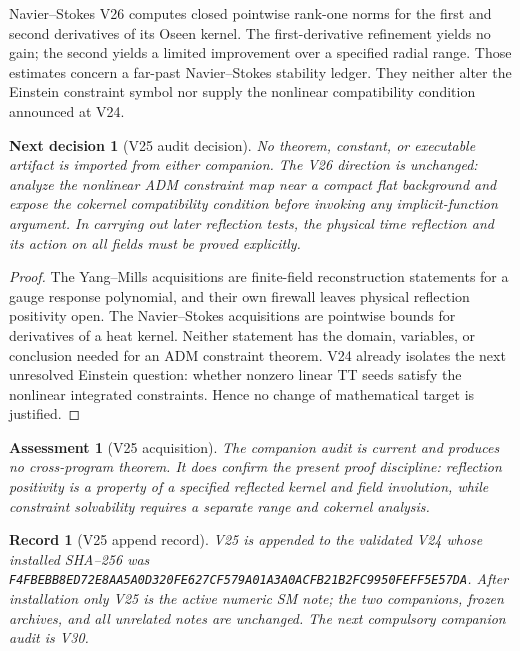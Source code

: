 \documentclass[11pt]{article}
\newtheorem{decision}[theorem]{Next decision}
\newtheorem{assessment}[theorem]{Assessment}
\newtheorem{record}[theorem]{Record}
\theoremstyle{remark}
\begin{document}
Navier--Stokes V26 computes closed pointwise rank-one norms for the first
and second derivatives of its Oseen kernel.  The first-derivative
refinement yields no gain; the second yields a limited improvement over a
specified radial range.  Those estimates concern a far-past
Navier--Stokes stability ledger.  They neither alter the Einstein
constraint symbol nor supply the nonlinear compatibility condition
announced at V24.

\begin{decision}[V25 audit decision]
\label{dec:v19v25-audit}
No theorem, constant, or executable artifact is imported from either
companion.  The V26 direction is unchanged: analyze the nonlinear ADM
constraint map near a compact flat background and expose the cokernel
compatibility condition before invoking any implicit-function argument.
In carrying out later reflection tests, the physical time reflection and
its action on all fields must be proved explicitly.
\end{decision}

\begin{proof}
The Yang--Mills acquisitions are finite-field reconstruction statements
for a gauge response polynomial, and their own firewall leaves physical
reflection positivity open.  The Navier--Stokes acquisitions are
pointwise bounds for derivatives of a heat kernel.  Neither statement has
the domain, variables, or conclusion needed for an ADM constraint
theorem.  V24 already isolates the next unresolved Einstein question:
whether nonzero linear TT seeds satisfy the nonlinear integrated
constraints.  Hence no change of mathematical target is justified.
\end{proof}

\begin{assessment}[V25 acquisition]
\label{ass:v19v25}
The companion audit is current and produces no cross-program theorem.
It does confirm the present proof discipline: reflection positivity is a
property of a specified reflected kernel and field involution, while
constraint solvability requires a separate range and cokernel analysis.
\end{assessment}

\begin{record}[V25 append record]
\label{rec:v19v25}
V25 is appended to the validated V24 whose installed SHA--256 was
\texttt{F4FBEBB8ED72E8AA5A0D320FE627CF579A01A3A0ACFB21B2FC9950FEFF5E57DA}.
After installation only V25 is the active numeric SM note; the two
companions, frozen archives, and all unrelated notes are unchanged.  The
next compulsory companion audit is V30.
\end{record}
\end{document}
